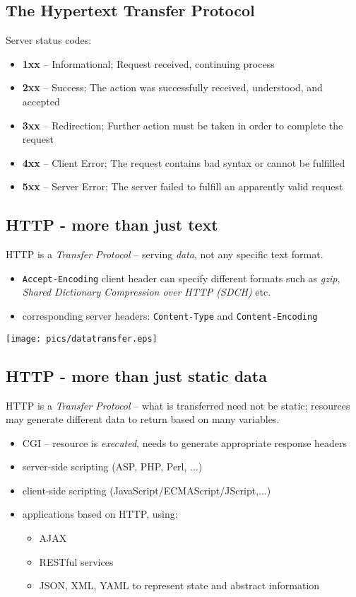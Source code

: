 \documentclass[xga]{xdvislides}
\begin{document}
\subsection{The Hypertext Transfer Protocol}
Server status codes:
\begin{itemize}
	\item {\bf 1xx} -- Informational; Request received, continuing process
	\item {\bf 2xx} -- Success; The action was successfully received,
        understood, and accepted
	\item {\bf 3xx} -- Redirection; Further action must be taken in order to
        complete the request
	\item {\bf 4xx} -- Client Error; The request contains bad syntax or
		cannot be fulfilled
	\item {\bf 5xx} -- Server Error; The server failed to fulfill an
		apparently valid request
\end{itemize}

\subsection{HTTP - more than just text}
HTTP is a {\em Transfer Protocol} -- serving {\em data}, not any specific
text format.

\begin{itemize}
	\item {\tt Accept-Encoding} client header can specify different formats
		such as {\em gzip}, {\em Shared Dictionary Compression over HTTP (SDCH)} etc.
	\item corresponding server headers: {\tt Content-Type} and
		{\tt Content-Encoding}
\end{itemize}
\begin{center}
	\texttt{[image: pics/datatransfer.eps]}
\end{center}

\subsection{HTTP - more than just static data}
HTTP is a {\em Transfer Protocol} -- what is transferred need not be
static; resources may generate different data to return based on many
variables.

\begin{itemize}
	\item CGI -- resource is {\em executed}, needs to generate
		appropriate response headers
	\item server-side scripting (ASP, PHP, Perl, ...)
	\item client-side scripting (JavaScript/ECMAScript/JScript,...)
	\item applications based on HTTP, using:
		\begin{itemize}
			\item AJAX
			\item RESTful services
			\item JSON, XML, YAML to represent state and
				abstract information
		\end{itemize}
\end{itemize}
\end{document}
